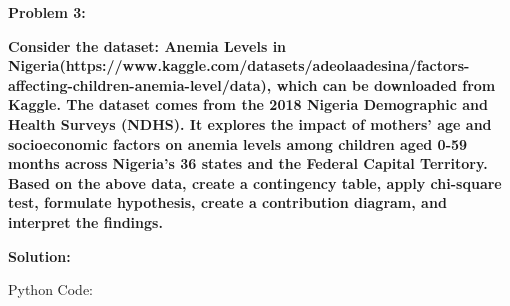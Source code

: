 \documentclass[12pt]{article}
\begin{document}
{\Large \textbf{Problem 3:}}

\vspace{0.2cm}

{\textbf{Consider the dataset: Anemia Levels in Nigeria(https://www.kaggle.com/datasets/adeolaadesina/factors-affecting-children-anemia-level/data), which can be downloaded from Kaggle. The dataset comes from the 2018 Nigeria Demographic and Health Surveys (NDHS). It explores the impact of mothers' age and socioeconomic factors on anemia levels among children aged 0-59 months across Nigeria's 36 states and the Federal Capital Territory. Based on the above data, create a contingency table, apply chi-square test, formulate hypothesis, create a contribution diagram, and interpret the findings.}}

\vspace{0.4cm}

{\large\textbf{Solution:}}

\vspace{0.1cm}

{\large{Python Code:}}

\vspace{0.2cm}
\end{document}
